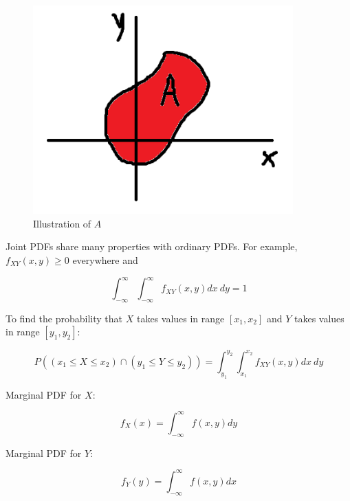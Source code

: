 \documentclass[12pt, a4paper]{article}
\newcounter{exa}
\begin{document}
\begin{figure}[H]
\centering
\includegraphics[width=100mm]{21.png}
\caption{Illustration of $A$}
\end{figure}

Joint PDFs share many properties with ordinary PDFs. For example, $f_{XY}(x,y)\ge0$ everywhere and

\[ \int_{-\infty}^\infty \int_{-\infty}^\infty f_{XY}(x,y) dx \:dy = 1 \]

To find the probability that $X$ takes values in range $[x_1, x_2]$ and $Y$ takes values in range $[y_1, y_2]$:

\[ P((x_1\le X\le x_2) \cap (y_1\le Y\le y_2)) = \int_{y_1}^{y_2} \int_{x_1}^{x_2} f_{XY}(x,y) dx \:dy \]

Marginal PDF for $X$:

\[ f_X(x)=\int_{-\infty}^\infty f(x,y) dy \]

Marginal PDF for $Y$:

\[ f_Y(y)=\int_{-\infty}^\infty f(x,y) dx \]
\end{document}
